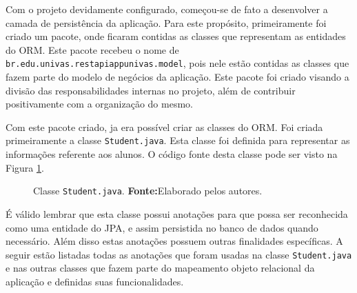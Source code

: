 	\pagebreak
	
	\par Com o projeto devidamente configurado, começou-se de fato a desenvolver a
camada de persistência da aplicação. Para este propósito, primeiramente foi
criado um pacote, onde ficaram contidas as classes que representam as entidades
do ORM. Este pacote recebeu o nome de
\texttt{br.edu.univas.restapiappunivas.model},  pois nele estão contidas as
classes que fazem parte do modelo de negócios da aplicação. Este pacote foi
criado visando a divisão das responsabilidades internas no projeto, além de
contribuir positivamente com a organização do mesmo. 
	
	\par Com este pacote criado, ja era possível criar as classes do ORM. Foi
criada primeiramente a classe \texttt{Student.java}. Esta classe foi definida
para representar as informações referente aos alunos. O código fonte desta
classe pode ser visto na Figura \ref{fig:desws11}.
	
	
	\begin{figure}[h!]
		
		\caption[Classe Student.java]{Classe \texttt{Student.java}.
			\textbf{Fonte:}Elaborado pelos autores.}
		\label{fig:desws11}
	\end{figure}
	
	\pagebreak
	
	\par É válido lembrar que esta classe possui anotações para que possa ser
reconhecida como uma entidade do JPA, e assim persistida no banco de dados
quando necessário. Além disso estas anotações possuem outras finalidades
específicas. A seguir estão listadas todas as anotações  que foram usadas na
classe \texttt{Student.java} e nas outras classes que fazem parte do mapeamento
objeto relacional da aplicação e definidas suas funcionalidades.

